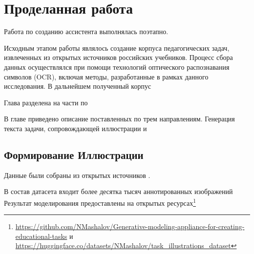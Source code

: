 \chapter{Проделанная работа}
Работа по созданию ассистента выполнялась поэтапно. 

Исходным этапом работы являлось создание корпуса педагогических задач, извлеченных из открытых источников российских учебников. Процесс сбора данных осуществлялся при помощи технологий оптического распознавания символов (OCR), включая методы, разработанные в рамках данного исследования.
 В дальнейшем полученный корпус

Глава разделена на части по 

В главе приведено описание поставленных по трем направлениям. Генерация текста задачи, сопровождающей иллюстрации и  

\section{Формирование Иллюстрации}

Данные были собраны из открытых источников \cite{libmipt}\cite{mathedu}. 


В состав датасета входит более десятка тысяч аннотированных изображений  
Результат моделирования предоставлены 
на открытых ресурсах\footnote{
\url{https://github.com/NMashalov/Generative-modeling-appliance-for-creating-educational-tasks}
и \url{https://huggingface.co/datasets/NMashalov/task_illustrations_dataset}
}

